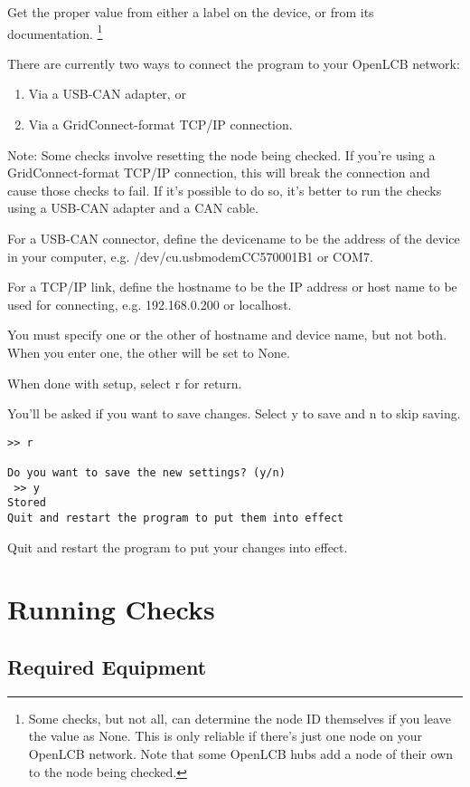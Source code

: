 Get the proper value from either a label on the device, or from its documentation.
\footnote{Some checks, but not all, can determine the node ID themselves if you leave
    the value as None. This is only reliable if there's just one node on your OpenLCB
    network.  Note that some OpenLCB hubs add a node of their own to the node
    being checked.}

There are currently two ways to connect the program to your OpenLCB network:
\begin{enumerate}
\item Via a USB-CAN adapter, or
\item Via a GridConnect-format TCP/IP connection.
\end{enumerate}

Note:  Some checks involve resetting the node being checked.
If you're using a GridConnect-format TCP/IP connection, this will break the
connection and cause those checks to fail.  If it's possible to do so, it's
better to run the checks using a USB-CAN adapter and a CAN cable.

For a USB-CAN connector, define the devicename to be the address of the device in your computer,
e.g. /dev/cu.usbmodemCC570001B1 or COM7.

For a TCP/IP link, define the hostname to be the IP address or host name to be used
for connecting, e.g. 192.168.0.200 or localhost.

You must specify one or the other of hostname and device name, but not both.
When you enter one, the other will be set to None.

When done with setup, select r for return.

You'll be asked if you want to save changes.
Select y to save and n to skip saving.

\begin{verbatim}
>> r

Do you want to save the new settings? (y/n)
 >> y
Stored
Quit and restart the program to put them into effect
\end{verbatim}

Quit and restart the program to put your changes into effect.

\section{Running Checks}

\subsection{Required Equipment}

